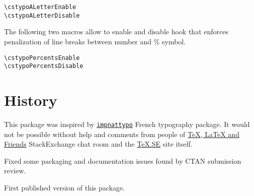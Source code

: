 \documentclass[paper=B5,DIV=calc,parskip=half]{scrartcl}
\begin{document}
\begin{lstlisting}[style=myLatexStyle]
\cstypoALetterEnable
\cstypoALetterDisable
\end{lstlisting}

The following two macros allow to enable and disable hook that enforces
penalization of line breaks between number and \% symbol.

\begin{lstlisting}[style=myLatexStyle]
\cstypoPercentsEnable
\cstypoPercentsDisable
\end{lstlisting}

\section{History}

This package was inspired by
\texttt{\href{http://www.ctan.org/pkg/impnattypo}{impnattypo}} French
typography package. It would not be possible without help and comments from
people of
\href{http://chat.stackexchange.com/rooms/41/tex-latex-and-friends}{\TeX{},
  \LaTeX{} and Friends} StackExchange chat room and the
\href{http://tex.stackexchange.com/}{\TeX.SE} site itself.

\begin{description}[style=nextline, labelwidth=4.5em, leftmargin=!, labelindent=0em]
\item[\texttt{v0.02}] Fixed some packaging and documentation issues found by
  CTAN submission review.
\item[\texttt{v0.01}] First published version of this package.
\end{description}
\end{document}
